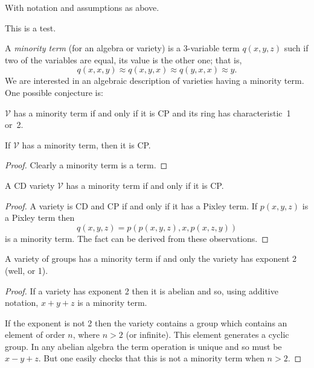   
  
  
  With notation and assumptions as above.
  
  \begin{theorem}
  This is a test.
  \end{theorem}
  
  
  
  
  
  
  
  
  
  
  
  A \emph{minority term} (for an algebra or variety) is a
  3-variable term $q(x,y,z)$ such if two of the variables
  are equal, its value is the other one; that is,
  \[
  q(x,x,y) \approx q(x,y,x) \approx q(y,x,x) \approx y.
  \]
  We are interested in an algebraic description of varieties having
  a minority term. One possible conjecture is:
  \begin{conjecture}
  $\mathcal V$ has a minority term if and only if it is CP and its
  ring has characteristic~1 or~2.
  \end{conjecture}
  
  
  
  \begin{fact}
  If $\mathcal V$ has a minority term, then it is CP.
  \end{fact}
  
  \begin{proof}
  Clearly a minority term is a \malcev term.
  \end{proof}
  
  \begin{fact}
  A CD variety $\mathcal V$ has a minority term if and
  only if it is CP.
  \end{fact}
  
  \begin{proof}
  A variety is CD and CP if and only if it has a Pixley term.
  If $p(x,y,z)$ is a Pixley term then
  \[
  q(x,y,z) = p(p(x,y,z),x,p(x,z,y))
  \]
  is a minority term. The fact can be derived from these
  observations.
  \end{proof}
  
  \begin{fact}
  A variety of groups has a minority term if and only
  the variety has exponent 2 (well, or 1).
  \end{fact}
  
  \begin{proof}
  If a variety has exponent 2 then it is abelian and so,
  using additive notation, $x + y + z$ is a minority term.
  
  If the exponent is not 2 then the variety contains a group
  which contains an element of order $n$, where $n > 2$ (or
  infinite). This element generates a cyclic group. In any
  abelian algebra the \malcev term operation is unique and so
  must be $x - y + z$. But one easily checks that this is not
  a minority term when $n > 2$.
  \end{proof}
  
